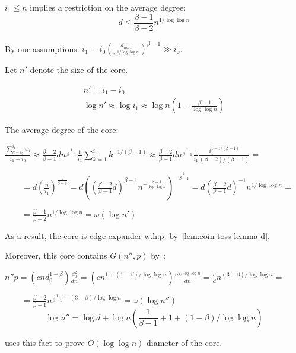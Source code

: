 $i_1\leq n$ implies a restriction on the average degree:
\begin{equation}
    d\leq\frac{\beta-1}{\beta-2}n^{1/\log\log n}
\end{equation}

By our assumptions: $i_1=i_0\left(\frac{d_{max}}{n^{1/\log\log n}}\right)^{\beta-1}\gg i_0$.

Let $n'$ denote the size of the core.

\begin{gather}
    n'=i_1-i_0\\
    \log n'\approx\log i_1\approx\log n\left(1-\frac{\beta-1}{\log\log n}\right)
\end{gather}

The average degree of the core:

$\frac{\sum_{k=i_0}^{i_1}{w_i}}{i_1-i_0}
\approx\frac{\beta-2}{\beta-1}dn^{\frac{1}{\beta-1}}\frac{1}{i_1}
\sum_{k=1}^{i_1}{k^{-1/(\beta-1)}}
\approx\frac{\beta-2}{\beta-1}dn^{\frac{1}{\beta-1}}\frac{1}{i_1}
\frac{i_1^{1-1/(\beta-1)}}{(\beta-2)/(\beta-1)}=$

$\qquad=d\left(\frac{n}{i_1}\right)^{\frac{1}{\beta-1}}
=d\left(\left(\frac{\beta-2}{\beta-1}d\right)^{\beta-1}n^{-\frac{\beta-1}{\log\log n}}\right)^{-\frac{1}{\beta-1}}
=d\left(\frac{\beta-2}{\beta-1}d\right)^{-1}n^{1/\log\log n}=$

$\qquad=\frac{\beta-1}{\beta-2}n^{1/\log\log n}=\omega(\log n')$

As a result, the core is edge expander w.h.p. by~\autoref{lem:coin-toss-lemma-d}.

Moreover, this core contains $G(n'',p)$ by~\cite{cl04}:

$n''p=\left(cnd_0^{1-\beta}\right)\frac{d_0^2}{dn}
=\left(cn^{1+(1-\beta)/\log\log n}\right)\frac{n^{2/\log\log n}}{dn}
=\frac{c}{d}n^{(3-\beta)/\log\log n}=$

$\qquad=\frac{\beta-2}{\beta-1}n^{\frac{1}{\beta-1}+(3-\beta)/\log\log n}
=\omega(\log n'')$
\begin{equation}
    \log n''=\log d+\log n(\frac{1}{\beta-1}+1+(1-\beta)/\log\log n)
\end{equation}

\cite{cl04} uses this fact to prove $O(\log\log n)$ diameter of the core.

